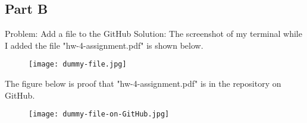 \documentclass{article}
\begin{document}
\subsection*{Part B}
Problem: Add a file to the GitHub
Solution: The screenshot of my terminal while I added the file "hw-4-assignment.pdf" is shown below.
\begin{figure}[h]
	\centering
	\texttt{[image: dummy-file.jpg]}
\end{figure}
\newpage
The figure below is proof that "hw-4-assignment.pdf" is in the repository on GitHub.
\begin{figure}[h]
	\centering
	\texttt{[image: dummy-file-on-GitHub.jpg]}
\end{figure}
\end{document}
